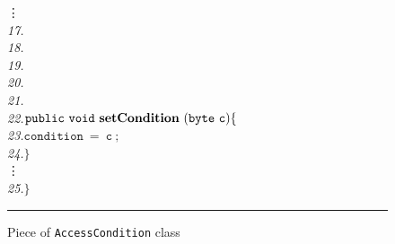 \begin{center}
\begin{figure}[hbt]
\begin{tabbing}
\>\>\vdots \\

\emph{17.}\> \\
\emph{18.}\>\> \\
\emph{19.}\>\> \\
\emph{20.}\>\> \\
\emph{21.}\>\>{\it */} \\
\emph{22.}\>\>$\mathtt{public\ void\ {\bf setCondition}\ (byte\ c)\{}$\\
\emph{23.}\>\>\>$\mathtt{condition\ =\ c\ ;}$\\
\emph{24.}\>\>$\mathtt{\}}$\\

\>\>\vdots \\
\emph{25.}\>$\mathtt{\}}$
\end{tabbing}
\caption{Piece of {\tt AccessCondition} class}
\label{fig-cla-acc}
\rule{\linewidth}{0.3mm}
\end{figure}
\end{center}


